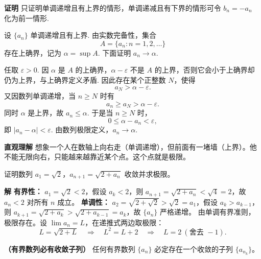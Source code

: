 \documentclass[fontset=fandol]{ctexart}
\newenvironment{custom}[1]{\par\noindent\textbf{#1}\quad}{\par\vspace{0.8em}}
\begin{document}
\begin{custom}{证明}
只证明单调递增且有上界的情形，单调递减且有下界的情形可令 $b_n=-a_n$ 化为前一情形.

设 $\{a_n\}$ 单调递增且有上界. 由实数完备性，集合
\[
A=\{a_n:n=1,2,\ldots\}
\]
存在上确界，记为 $\alpha=\sup A$. 下面证明 $a_n\to\alpha$.

任取 $\varepsilon>0$. 因 $\alpha$ 是 $A$ 的上确界，$\alpha-\varepsilon$ 不是 $A$ 的上界，否则它会小于上确界却仍为上界，与上确界定义矛盾. 因此存在某个正整数 $N$，使得
\[
a_N>\alpha-\varepsilon.
\]
又因数列单调递增，当 $n\ge N$ 时有
\[
a_n\ge a_N>\alpha-\varepsilon.
\]
同时 $\alpha$ 是上界，故 $a_n\le \alpha$. 于是当 $n\ge N$ 时，
\[
0\le \alpha-a_n<\varepsilon,
\]
即 $|a_n-\alpha|<\varepsilon$. 由数列极限定义，$a_n\to\alpha$.
\end{custom}

\begin{custom}{直观理解}
想象一个人在数轴上向右走（单调递增），但前面有一堵墙（上界）。他不能无限向右，只能越来越靠近某个点。这个点就是极限。
\end{custom}

\begin{example}[重要例子]
证明数列 \(a_1 = \sqrt{2}\)，\(a_{n+1} = \sqrt{2 + a_n}\) 收敛并求极限。
\end{example}
\begin{custom}{解}
\textbf{有界性：} \(a_1 = \sqrt{2} < 2\)，假设 \(a_k < 2\)，则 \(a_{n+1} = \sqrt{2 + a_n} < \sqrt{4} = 2\)，故 \(a_n < 2\) 对所有 \(n\) 成立。
\textbf{单调性：} \(a_2 = \sqrt{2+\sqrt{2}} > \sqrt{2} = a_1\)，假设 \(a_k > a_{k-1}\)，则 \(a_{k+1} = \sqrt{2 + a_k} > \sqrt{2 + a_{k-1}} = a_k\)，故 \(\{a_n\}\) 严格递增。
由单调有界准则，极限存在。设 \(\lim a_n = L\)，在递推式两边取极限：
\[
L = \sqrt{2 + L} \quad\Longrightarrow\quad L^2 = L + 2 \quad\Longrightarrow\quad L = 2\ (\text{舍去 } -1).
\]
\end{custom}

\begin{theorem}
\textbf{（有界数列必有收敛子列）}
任何有界数列 \(\{a_n\}\) 必定存在一个收敛的子列 \(\{a_{n_k}\}\)。
\end{theorem}
\end{document}
